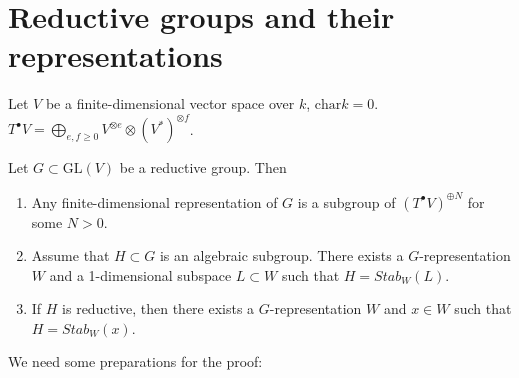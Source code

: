 \section{Reductive groups and their
representations}
\label{section-reduc-group-their-repre}

\noindent
Let $V$ be a finite-dimensional vector space
over $k$, $\text{char}k=0$.
$T^\bullet V=\bigoplus_{e,f \geq 0}V^{\otimes
e}\otimes (V^* )^{\otimes f}$.

\begin{theorem}
\label{theorem-reduc-group-repre}
Let $G\subset \text{GL}(V)$ be a reductive
group.
Then
\begin{enumerate}
\item Any finite-dimensional representation
of $G$
is a subgroup of $(T^\bullet V)^{\oplus  N}$
for some  $N>0$.

\item Assume that $H \subset G$
is an algebraic subgroup.
There exists a $G$-representation $W$
and a 1-dimensional subspace $L \subset W$
such that $H=Stab_W(L)$.

\item If $H$ is reductive,
then there exists a $G$-representation $W$
and $x \in W$ such that $H=Stab_W(x)$.
\end{enumerate}
\end{theorem}

\noindent
We need some preparations for the proof:


